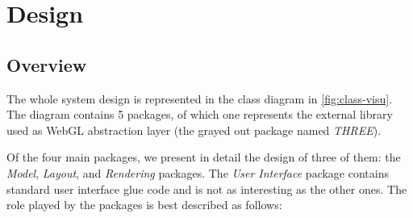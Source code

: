 \section{Design}
\label{sec:visu/design}


\subsection{Overview}

The whole system design is represented in the class diagram in \vref{fig:class-visu}. The diagram contains 5 packages, of which one represents the external library used as WebGL abstraction layer (the grayed out package named \emph{THREE}).

Of the four main packages, we present in detail the design of three of them: the \emph{Model}, \emph{Layout}, and \emph{Rendering} packages. The \emph{User Interface} package contains standard user interface glue code and is not as interesting as the other ones. The role played by the packages is best described as follows:

